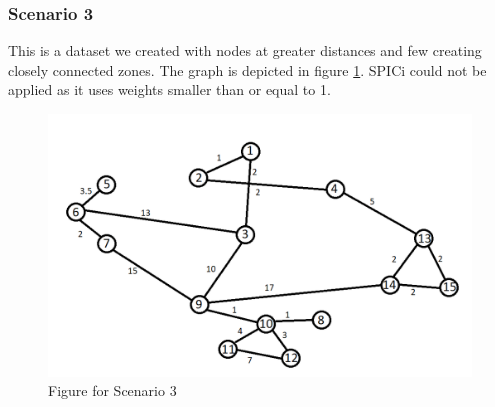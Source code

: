 \documentclass[8pt]{extarticle}
\begin{document}
	\subsubsection{Scenario 3}
	This is a dataset we created with nodes at greater distances and few creating closely connected zones. The graph is depicted in figure \ref{fig:separate}. SPICi could not be applied as it uses weights smaller than or equal to 1.
	\begin{figure}
		\includegraphics[width=\linewidth]{separated.png}
		\caption{Figure for Scenario 3}
		\label{fig:separate}
	\end{figure}
\end{document}
